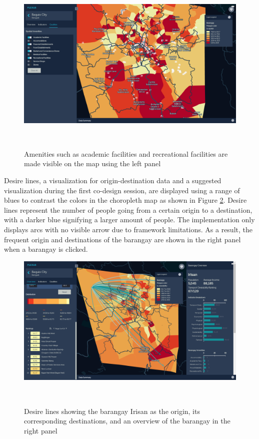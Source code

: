 \documentclass{sigchi}
\begin{document}
\begin{figure}
\centering
  \includegraphics[width=0.9\columnwidth]{figures/kepler9.PNG}
  \caption{Amenities such as academic facilities and recreational facilities are made visible on the map using the left panel}~\label{fig:KeplerAmenities}
\end{figure}

Desire lines, a visualization for origin-destination data and a suggested visualization during the first co-design session, are displayed using a range of blues to contrast the colors in the choropleth map as shown in Figure \ref{fig:KeplerDesireLines}. Desire lines represent the number of people going from a certain origin to a destination, with a darker blue signifying a larger amount of people. The implementation only displays arcs with no visible arrow due to framework limitations. As a result, the frequent origin and destinations of the barangay are shown in the right panel when a barangay is clicked. 

\begin{figure}
\centering
  \includegraphics[width=0.9\columnwidth]{figures/overview2.PNG}
  \caption{Desire lines showing the barangay Irisan as the origin, its corresponding destinations, and an overview of the barangay in the right panel }~\label{fig:KeplerDesireLines}
\end{figure}
\end{document}
